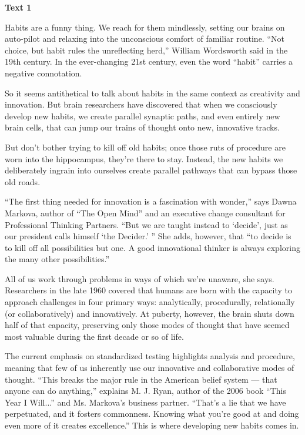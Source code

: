 \begin{center}\textbf{Text 1}\end{center}

\qquad Habits are a funny thing. We reach for them mindlessly, setting our brains on auto-pilot and relaxing into the unconscious comfort of familiar routine. ``Not choice, but habit rules the unreflecting herd,'' William Wordsworth said in the 19th century. In the ever-changing 21st century, even the word ``habit'' carries a negative connotation.

\qquad So it seems antithetical to talk about habits in the same context as creativity and innovation. But brain researchers have discovered that when we consciously develop new habits, we create parallel synaptic paths, and even entirely new brain cells, that can jump our trains of thought onto new, innovative tracks.

\qquad But don't bother trying to kill off old habits; once those ruts of procedure are worn into the hippocampus, they're there to stay. Instead, the new habits we deliberately ingrain into ourselves create parallel pathways that can bypass those old roads.

\qquad ``The first thing needed for innovation is a fascination with wonder,'' says Dawna Markova, author of ``The Open Mind'' and an executive change consultant for Professional Thinking Partners. ``But we are taught instead to `decide', just as our president calls himself `the Decider.' '' She adds, however, that ``to decide is to kill off all possibilities but one. A good innovational thinker is always exploring the many other possibilities.''

\qquad All of us work through problems in ways of which we're unaware, she says. Researchers in the late 1960 covered that humans are born with the capacity to approach challenges in four primary ways: analytically, procedurally, relationally (or collaboratively) and innovatively. At puberty, however, the brain shuts down half of that capacity, preserving only those modes of thought that have seemed most valuable during the first decade or so of life.

\qquad The current emphasis on standardized testing highlights analysis and procedure, meaning that few of us inherently use our innovative and collaborative modes of thought. ``This breaks the major rule in the American belief system — that anyone can do anything,'' explains M. J. Ryan, author of the 2006 book ``This Year I Will...'' and Ms. Markova's business partner. ``That's a lie that we have perpetuated, and it fosters commonness. Knowing what you're good at and doing even more of it creates excellence.'' This is where developing new habits comes in.

